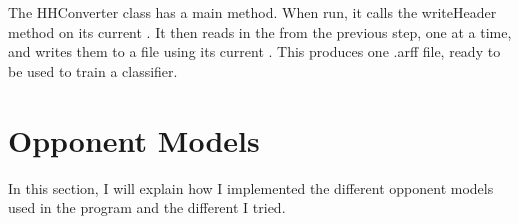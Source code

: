 The HHConverter class has a main method. When run, it calls the writeHeader method on its current \wf. It then reads in the \grs from the previous step, one at a time, and writes them to a file using its current \mbox{\wf}. This produces one .arff file, ready to be used to train a classifier.






\section{Opponent Models}						%



In this section, I will explain how I implemented the different opponent models used in the program and the different \wfs I tried.


